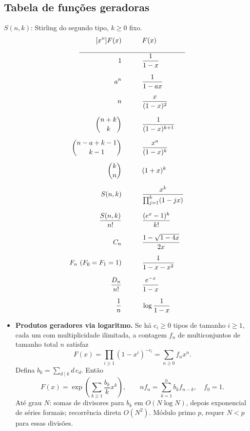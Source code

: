 \subsection{Tabela de funções geradoras}
$S(n,k)$: Stirling do segundo tipo, $k\ge0$ fixo.
\begingroup
\allowdisplaybreaks[4]
\begin{alignat*}{2}
	[x^n]F(x) &\qquad && F(x) \\
	\rlap{\hspace{-0.18\linewidth}\rule{0.45\linewidth}{0.4pt}} &&& \\[-1.4ex]
	1 &\qquad && \dfrac{1}{1 - x} \\[6pt]
	a^n &\qquad && \dfrac{1}{1 - ax} \\[6pt]
	n &\qquad && \dfrac{x}{(1 - x)^2} \\[6pt]
	\binom{n + k}{k} &\qquad && \dfrac{1}{(1 - x)^{k + 1}} \\[6pt]
	\binom{n - a + k - 1}{k - 1} &\qquad && \dfrac{x^a}{(1-x)^{k}} \\[6pt]
	\binom{k}{n} &\qquad && (1 + x)^k \\[6pt]
	S(n,k) &\qquad && \dfrac{x^k}{\prod_{j=1}^{k}(1-jx)} \\[6pt]
	\dfrac{S(n,k)}{n!} &\qquad && \dfrac{(e^x-1)^k}{k!} \\[6pt]
	C_n &\qquad && \dfrac{1 - \sqrt{1 - 4x}}{2x} \\[6pt]
	F_n\ (F_0=F_1=1) &\qquad && \dfrac{1}{1 - x - x^2} \\[6pt]
	\dfrac{D_n}{n!} &\qquad && \dfrac{e^{-x}}{1 - x} \\[6pt]
	\dfrac{1}{n} &\qquad && \log\dfrac{1}{1-x}
\end{alignat*}
\endgroup
\ifextended
\begin{itemize}[leftmargin=*,label={}]
\item \textbf{Produtos geradores via logaritmo.}
Se há $c_i\ge0$ tipos de tamanho $i\ge1$, cada um com multiplicidade ilimitada, a contagem $f_n$ de multiconjuntos de tamanho total $n$ satisfaz
\[
F(x)=\prod_{i\ge1}(1-x^i)^{-c_i}=\sum_{n\ge0}f_nx^n.
\]
Defina $b_k=\sum_{d\mid k}d\,c_d$. Então
\[
F(x)=\exp\left(\sum_{k\ge1}\frac{b_k}{k}x^k\right),
\qquad nf_n=\sum_{k=1}^{n}b_kf_{n-k},\quad f_0=1.
\]
Até grau $N$: somas de divisores para $b_k$ em $O(N\log N)$, depois exponencial de séries formais; recorrência direta $O(N^2)$. Módulo primo $p$, requer $N<p$ para essas divisões.
\end{itemize}
\fi

